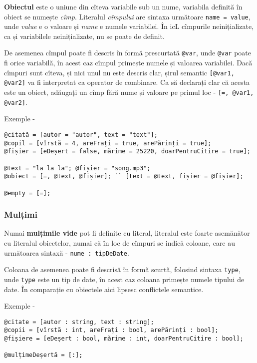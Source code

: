 {\bf Obiectul} este o uniune din cîteva variabile sub un nume, variabila definită în obiect se numește {\it cîmp}. Literalul {\it cîmpului} are sintaxa următoare \texttt{name = value}, unde  {\it value} e o valoare și {\it name} e numele variabilei. În icL cîmpurile neinițializate, ca și variabilele neinițializate, nu se poate de definit.

De asemenea cîmpul poate fi descris în formă prescurtată \texttt{@var}, unde \texttt{@var} poate fi orice variabilă, în acest caz cîmpul primește numele și valoarea variabilei. Dacă cîmpuri sunt cîteva, și nici unul nu este descris clar, șirul semantic \texttt{[@var1, @var2]} va fi interpretat ca operator de combinare. Ca să declarați clar că acesta este un obiect, adăugați un cîmp fără nume și valoare pe primul loc - \texttt{[=, @var1, @var2]}.

\noindent Exemple -
\begin{verbatim}
@citată = [autor = "autor", text = "text"];
@copil = [vîrstă = 4, areFrați = true, arePărinți = true];
@fișier = [eDeșert = false, mărime = 25220, doarPentruCitire = true];

@text = "la la la"; @fișier = "song.mp3";
@obiect = [=, @text, @fișier]; `` [text = @text, fișier = @fișier];

@empty = [=];
\end{verbatim}

\subsubsection{Mulțimi}

Numai {\bf mulțimile vide} pot fi definite cu literal, literalul este foarte asemănător cu literalul obiectelor, numai că în loc de cîmpuri se indică coloane, care au următoarea sintaxă - \texttt{nume : tipDeDate}.

Coloana de asemenea poate fi descrisă în formă scurtă, folosind sintaxa \texttt{type}, unde \texttt{type} este un tip de date, în acest caz coloana primește numele tipului de date. În comparație cu obiectele aici lipsesc conflictele semantice.

\noindent Exemple -
\begin{verbatim}
@citate = [autor : string, text : string];
@copii = [vîrstă : int, areFrați : bool, arePărinți : bool];
@fișiere = [eDeșert : bool, mărime : int, doarPentruCitire : bool];

@mulțimeDeșertă = [:];
\end{verbatim}

